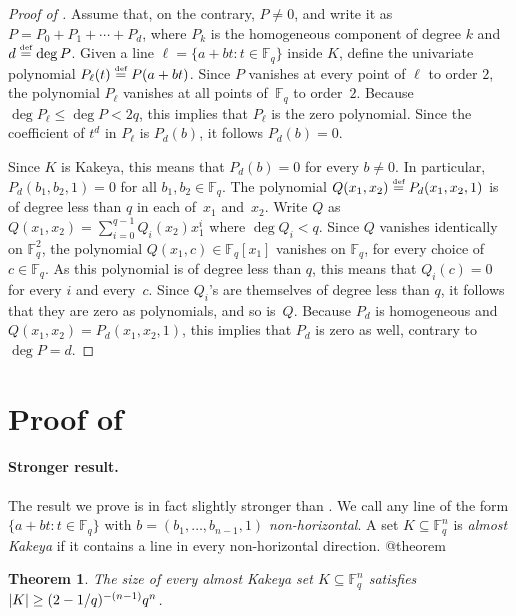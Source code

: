 \documentclass{daj}
\makeatletter
\newtheorem{theorem}{Theorem}
\newcommand{\neutralize}[1]{\expandafter\let\csname c@#1\endcsname\count@}
\newenvironment{theoremprime}[1]
  {\renewcommand{\thetheorem}{\ref*{#1}$'$}%
   \neutralize{theorem}\phantomsection
   \begin{theorem}}
  {\end{theorem}}
\theoremstyle{definition}
\newcommand*{\eqdef}{\stackrel{\mbox{\normalfont\tiny def}}{=}}   %
\newcommand*{\Fq}{\mathbb{F}_q}                                  %
\DeclarePairedDelimiter\abs{\lvert}{\rvert}                     %
\makeatother
\begin{document}
\begin{proof}[Proof of ]
  Assume that, on the contrary, $P\neq 0$, and write it as $P=P_0+P_1+\cdots+P_d$, where $P_k$ is the homogeneous component of degree $k$ and $d\eqdef \deg P$.
  Given a line $\ell=\{a +b t:t\in \mathbb{F}_q\}$ inside $K$, define the univariate polynomial $P_\ell (t)\eqdef P(a +b t)$.
  Since $P$ vanishes at every point of $\ell$ to order $2$, the polynomial $P_{\ell}$ vanishes at all points of~$\Fq$ to order~$2$.
  Because $\deg P_\ell\leq \deg P<2q$, this implies that $P_\ell$ is the zero polynomial.
  Since the coefficient of $t^d$ in $P_{\ell}$ is $P_d(b)$, it follows $P_d(b)=0$.

  Since $K$ is Kakeya, this means that $P_d(b)=0$ for every $b\neq 0$. In particular, $P_d(b_1,b_2,1)=0$ for all $b_1,b_2\in\Fq$.
  The polynomial $Q(x_1,x_2)\eqdef P_d(x_1,x_2,1)$ is of degree less than $q$ in each of~$x_1$ and~$x_2$.
  Write $Q$ as $Q(x_1,x_2)=\sum_{i=0}^{q-1} Q_i(x_2)x_1^i$ where $\deg Q_i<q$.
  Since $Q$ vanishes identically on $\Fq^2$, the polynomial $Q(x_1,c)\in \Fq[x_1]$ vanishes on $\Fq$, for every choice of $c\in \Fq$.
  As this polynomial is of degree less than $q$, this means that $Q_i(c)=0$ for every $i$ and every~$c$. Since
  $Q_i$'s are themselves of degree less than $q$, it follows that they are zero as polynomials, and so is~$Q$.
  Because $P_d$ is homogeneous and $Q(x_1,x_2)=P_d(x_1,x_2,1)$, this implies that $P_d$ is zero as well, contrary to $\deg P=d$.
\end{proof}


\section{Proof of \texorpdfstring{}{Theorem 1}}\label{sec:advanced}
\paragraph{Stronger result.}
The result we prove is in fact slightly stronger than .
We call any line of the form $\{a+bt: t\in\Fq\}$ with $b=(b_1,\dotsc,b_{n-1},1)$ \emph{non-horizontal}.
A set $K\subseteq \Fq^n$ is \emph{almost Kakeya} if it contains a line in every non-horizontal direction.
\begin{theoremprime}{thm:high}\label{thm:highstrong}
The size of every almost Kakeya set $K\subseteq \Fq^n$ satisfies $\abs{K}\geq (2-1/q)^{-(n-1)}q^n$.
\end{theoremprime}
\end{document}

